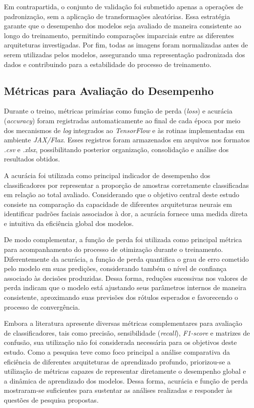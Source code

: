 Em contrapartida, o conjunto de validação foi submetido apenas a operações de padronização, sem a aplicação de transformações aleatórias. Essa estratégia garante que o desempenho dos modelos seja avaliado de maneira consistente ao longo do treinamento, permitindo comparações imparciais entre as diferentes arquiteturas investigadas. Por fim, todas as imagens foram normalizadas antes de serem utilizadas pelos modelos, assegurando uma representação padronizada dos dados e contribuindo para a estabilidade do processo de treinamento.

\subsection*{Métricas para Avaliação do Desempenho}

Durante o treino, métricas primárias como função de perda (\textit{loss}) e acurácia (\textit{accuracy}) foram registradas automaticamente ao final de cada época por meio dos mecanismos de \textit{log} integrados ao \textit{TensorFlow} e às rotinas implementadas em ambiente \textit{JAX/Flax}. Esses registros foram armazenados em arquivos nos formatos \textit{.csv} e \textit{.xlsx}, possibilitando posterior organização, consolidação e análise dos resultados obtidos.

A acurácia foi utilizada como principal indicador de desempenho dos classificadores por representar a proporção de amostras corretamente classificadas em relação ao total avaliado. Considerando que o objetivo central deste estudo consiste na comparação da capacidade de diferentes arquiteturas neurais em identificar padrões faciais associados à dor, a acurácia fornece uma medida direta e intuitiva da eficiência global dos modelos. 

De modo complementar, a função de perda foi utilizada como principal métrica para acompanhamento do processo de otimização durante o treinamento. Diferentemente da acurácia, a função de perda quantifica o grau de erro cometido pelo modelo em suas predições, considerando também o nível de confiança associado às decisões produzidas. Dessa forma, reduções sucessivas nos valores de perda indicam que o modelo está ajustando seus parâmetros internos de maneira consistente, aproximando suas previsões dos rótulos esperados e favorecendo o processo de convergência.

Embora a literatura apresente diversas métricas complementares para avaliação de classificadores, tais como precisão, sensibilidade (\textit{recall}), \textit{F1-score} e matrizes de confusão, sua utilização não foi considerada necessária para os objetivos deste estudo. Como a pesquisa teve como foco principal a análise comparativa da eficiência de diferentes arquiteturas de aprendizado profundo, priorizou-se a utilização de métricas capazes de representar diretamente o desempenho global e a dinâmica de aprendizado dos modelos. Dessa forma, acurácia e função de perda mostraram-se suficientes para sustentar as análises realizadas e responder às questões de pesquisa propostas.

